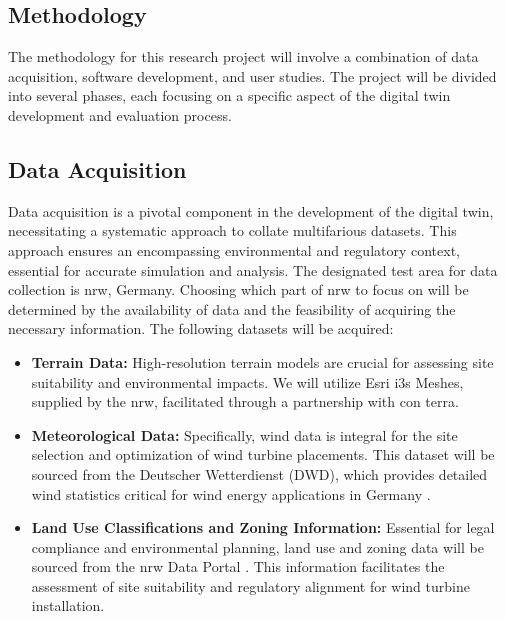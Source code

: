 \documentclass[11pt, titlepage, a4paper]{scrartcl}
\begin{document}
\begin{linenumbers}
    \section{Methodology}
    The methodology for this research project will involve a combination of data acquisition, software development, and user studies. The project will be divided into several phases, each focusing on a specific aspect of the digital twin development and evaluation process.

    \subsection{Data Acquisition}
    Data acquisition is a pivotal component in the development of the digital twin, necessitating a systematic approach to collate multifarious datasets. This approach ensures an encompassing environmental and regulatory context, essential for accurate simulation and analysis. The designated test area for data collection is \gls{nrw}, Germany. Choosing which part of \gls{nrw} to focus on will be determined by the availability of data and the feasibility of acquiring the necessary information.
    The following datasets will be acquired:

    \begin{itemize}
        \item \textbf{Terrain Data:} High-resolution terrain models are crucial for assessing site suitability and environmental impacts. We will utilize Esri \gls{i3s} Meshes, supplied by the \gls{nrw}, facilitated through a partnership with con terra.

        \item \textbf{Meteorological Data:} Specifically, wind data is integral for the site selection and optimization of wind turbine placements. This dataset will be sourced from the Deutscher Wetterdienst (DWD), which provides detailed wind statistics critical for wind energy applications in Germany \cite{deutscherwetterdienstWinddatenFurWindenergienutzer}.

        \item \textbf{Land Use Classifications and Zoning Information:} Essential for legal compliance and environmental planning, land use and zoning data will be sourced from the \gls{nrw} Data Portal \cite{ministeriumfurheimatkommunalesbauunddigitalisierungdeslandesnordrhein-westfalenOpenNRW}. This information facilitates the assessment of site suitability and regulatory alignment for wind turbine installation.


\end{itemize}
\end{linenumbers}
\end{document}
